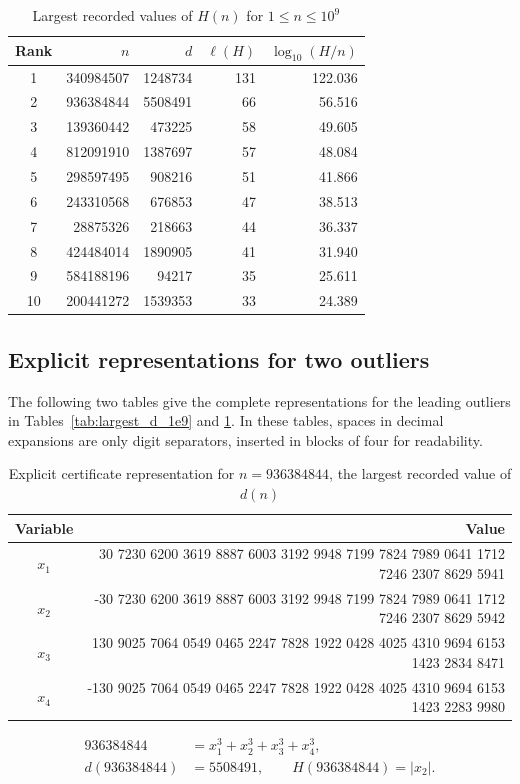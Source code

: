 \begin{table}[H]
\centering
\caption{Largest recorded values of $H(n)$ for $1\leq n\leq 10^9$}
\label{tab:largest_height_1e9}
\begin{tabular}{c r r r r}
\toprule
Rank & $n$ & $d$ & $\ell(H)$ & $\log_{10}(H/n)$ \\
\midrule
1 & 340984507 & 1248734 & 131 & 122.036 \\
2 & 936384844 & 5508491 & 66 & 56.516 \\
3 & 139360442 & 473225 & 58 & 49.605 \\
4 & 812091910 & 1387697 & 57 & 48.084 \\
5 & 298597495 & 908216 & 51 & 41.866 \\
6 & 243310568 & 676853 & 47 & 38.513 \\
7 & 28875326 & 218663 & 44 & 36.337 \\
8 & 424484014 & 1890905 & 41 & 31.940 \\
9 & 584188196 & 94217 & 35 & 25.611 \\
10 & 200441272 & 1539353 & 33 & 24.389 \\
\bottomrule
\end{tabular}
\end{table}

\subsection{Explicit representations for two outliers}

The following two tables give the complete representations for the leading
outliers in Tables~\ref{tab:largest_d_1e9} and
\ref{tab:largest_height_1e9}.  In these tables, spaces in decimal
expansions are only digit separators, inserted in blocks of four for
readability.

\begin{table}[H]
\centering
\caption{Explicit certificate representation for $n=936384844$, the largest recorded value of $d(n)$}
\label{tab:rep_936384844}
\begin{tabular}{c N}
\toprule
Variable & Value \\
\midrule
$x_1$ & 30 7230 6200 3619 8887 6003 3192 9948 7199 7824 7989 0641 1712 7246 2307 8629 5941 \\
$x_2$ & -30 7230 6200 3619 8887 6003 3192 9948 7199 7824 7989 0641 1712 7246 2307 8629 5942 \\
$x_3$ & 130 9025 7064 0549 0465 2247 7828 1922 0428 4025 4310 9694 6153 1423 2834 8471 \\
$x_4$ & -130 9025 7064 0549 0465 2247 7828 1922 0428 4025 4310 9694 6153 1423 2283 9980 \\
\bottomrule
\end{tabular}
\[
\begin{aligned}
        936384844 &= x_1^3+x_2^3+x_3^3+x_4^3,\\
        d(936384844) &= 5508491,\qquad H(936384844)=|x_2|.
\end{aligned}
\]
\end{table}

